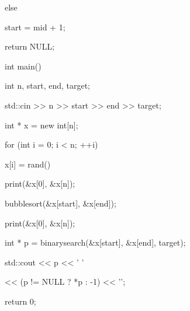\begin{consolethree}[escapeinside=||]
{{{        }

        else

        {

            start = mid + 1;

        }

    }

    return NULL;

}



int main()

{

    int n, start, end, target;

    std::cin >> n >> start >> end >> target;

    int * x = new int[n];

    for (int i = 0; i < n; ++i)

    {

        x[i] = rand() %

    }

    print(&x[0], &x[n]);

    bubblesort(&x[start], &x[end]);

    print(&x[0], &x[n]);

    int * p = binarysearch(&x[start], &x[end], target);

    std::cout << p << ' '

              << (p != NULL ? *p : -1) << '\n';

    return 0;

}

\end{consolethree}


